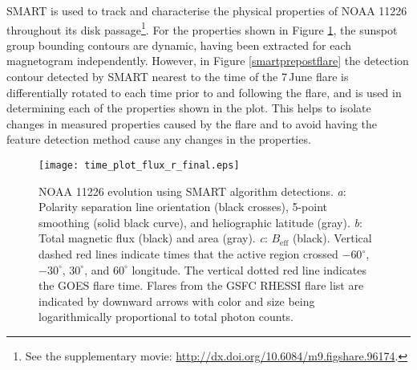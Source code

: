 {\gls{SMART} is used to track and characterise the physical properties of NOAA 11226 throughout its disk passage\footnote{See the supplementary movie: \url{http://dx.doi.org/10.6084/m9.figshare.96174}.}. 
For the properties shown in Figure \ref{smart_overview}, the sunspot group bounding contours are dynamic, having been extracted for each magnetogram independently. However, in Figure \ref{smartprepostflare} the detection contour detected by \gls{SMART} nearest to the time of the 7\,June flare is differentially rotated to each time prior to and following the flare, and is used in determining each of the properties shown in the plot. This helps to isolate changes in measured properties caused by the flare and to avoid having the feature detection method cause any changes in the properties.

\begin{figure}[!t]
\centerline{\texttt{[image: time\_plot\_flux\_r\_final.eps]}}
\caption[Long-term NOAA 11226 magnetic evolution.]{NOAA 11226 evolution using SMART algorithm detections. \emph{a}:  Polarity separation line orientation (black crosses), 5-point smoothing (solid black curve), and heliographic latitude (gray). \emph{b}: Total magnetic flux (black) and area (gray). \emph{c}: $B_{\mathrm{eff}}$ (black). Vertical dashed red lines indicate times that the active region crossed $-60^\circ$, $-30^\circ$, $30^\circ$, and $60^\circ$ longitude. The vertical dotted red line indicates the GOES flare time. Flares from the GSFC RHESSI flare list are indicated by downward arrows with color and size being logarithmically proportional to total photon counts.}
\label{smart_overview}
\end{figure}


}
